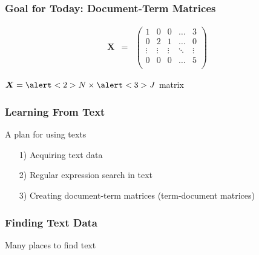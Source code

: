\documentclass{beamer}
\numberwithin{equation}{section}
\begin{document}
\begin{frame}
\frametitle{Goal for Today: Document-Term Matrices}

\begin{eqnarray}
\boldsymbol{X} & = & \begin{pmatrix}
1 & 0 & 0 & \hdots & 3 \\
0 & 2 & 1 & \hdots & 0 \\
\vdots & \vdots & \vdots & \ddots & \vdots \\
0 & 0 & 0 & \hdots & 5 \\
\end{pmatrix} \nonumber
\end{eqnarray}


$\boldsymbol{X} = \alert<2>{N} \times \alert<3>{J}$ matrix

\begin{itemize}
\end{itemize}


\pause \pause


\end{frame}






\begin{frame}
\frametitle{Learning From Text}


A plan for using texts
\begin{itemize}
\item[1)] Acquiring text data
\item[2)] Regular expression search in text
\item[3)] Creating document-term matrices (term-document matrices)
\end{itemize}


\end{frame}






\begin{frame}
\frametitle{Finding Text Data }
Many places to find text  \pause


 \pause
{}
\end{frame}
\end{document}
